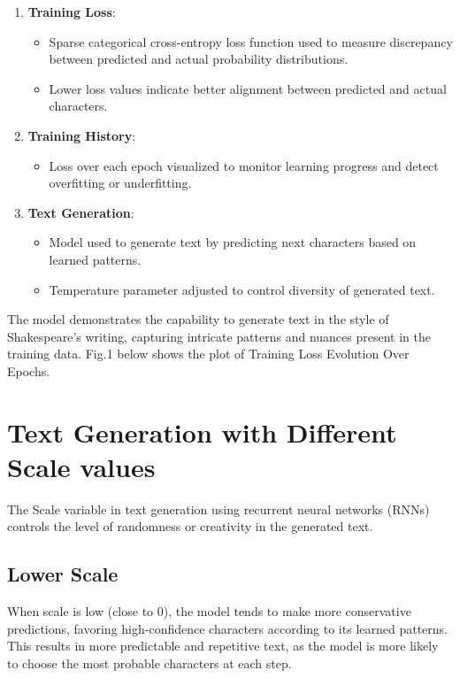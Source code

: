 \documentclass[conference]{IEEEtran}
\begin{document}
\begin{enumerate}
    \item \textbf{Training Loss}:
    \begin{itemize}
        \item Sparse categorical cross-entropy loss function used to measure discrepancy between predicted and actual probability distributions.
        \item Lower loss values indicate better alignment between predicted and actual characters.
    \end{itemize}
    
    \item \textbf{Training History}:
    \begin{itemize}
        \item Loss over each epoch visualized to monitor learning progress and detect overfitting or underfitting.
    \end{itemize}
    
    \item \textbf{Text Generation}:
    \begin{itemize}
        \item Model used to generate text by predicting next characters based on learned patterns.
        \item Temperature parameter adjusted to control diversity of generated text.
    \end{itemize}

\end{enumerate}

The model demonstrates the capability to generate text in the style of Shakespeare's writing, capturing intricate patterns and nuances present in the training data. Fig.1 below shows the plot of Training Loss Evolution Over Epochs.






\section*{Text Generation with Different Scale values}

The Scale variable in text generation using recurrent neural networks (RNNs) controls the level of randomness or creativity in the generated text.

\subsection*{Lower Scale}
When scale is low (close to 0), the model tends to make more conservative predictions, favoring high-confidence characters according to its learned patterns. This results in more predictable and repetitive text, as the model is more likely to choose the most probable characters at each step.
\end{document}
